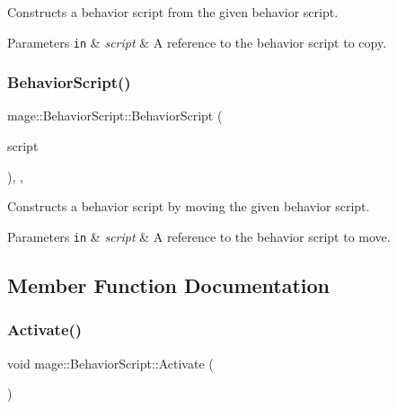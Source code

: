 Constructs a behavior script from the given behavior script.


\begin{DoxyParams}[1]{Parameters}
\mbox{\tt in}  & {\em script} & A reference to the behavior script to copy. \\
\hline
\end{DoxyParams}
\hypertarget{classmage_1_1_behavior_script_abae69e797a05fa2cd1c3b7704f1c6767}{}\label{classmage_1_1_behavior_script_abae69e797a05fa2cd1c3b7704f1c6767} 
\subsubsection{\texorpdfstring{Behavior\+Script()}{BehaviorScript()}\hspace{0.1cm}{\footnotesize\ttfamily [3/3]}}
{\footnotesize\ttfamily mage\+::\+Behavior\+Script\+::\+Behavior\+Script (\begin{DoxyParamCaption}\item[{\hyperlink{classmage_1_1_behavior_script}{Behavior\+Script} \&\&}]{script }\end{DoxyParamCaption})\hspace{0.3cm}{\ttfamily [protected]}, {\ttfamily [default]}, {\ttfamily [noexcept]}}

Constructs a behavior script by moving the given behavior script.


\begin{DoxyParams}[1]{Parameters}
\mbox{\tt in}  & {\em script} & A reference to the behavior script to move. \\
\hline
\end{DoxyParams}


\subsection{Member Function Documentation}
\hypertarget{classmage_1_1_behavior_script_a84a5bf0fc7ec3ecd36dddaf001143b54}{}\label{classmage_1_1_behavior_script_a84a5bf0fc7ec3ecd36dddaf001143b54} 
\subsubsection{\texorpdfstring{Activate()}{Activate()}}
{\footnotesize\ttfamily void mage\+::\+Behavior\+Script\+::\+Activate (\begin{DoxyParamCaption}{ }\end{DoxyParamCaption})\hspace{0.3cm}{\ttfamily [noexcept]}}

